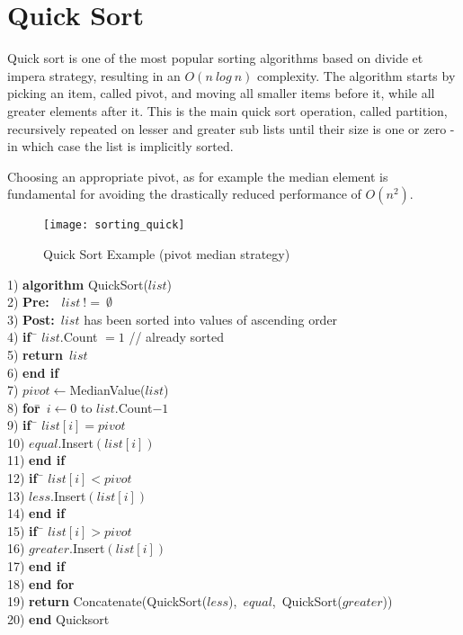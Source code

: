 \newpage
\section{Quick Sort} 
Quick sort is one of the most popular sorting algorithms based on divide et impera strategy, resulting in an $O(n~log~n)$ complexity. The algorithm starts by picking an item, called pivot, and moving all smaller items before it, while all greater elements after it. This is the main quick sort operation, called partition, recursively repeated on lesser and greater sub lists until their size  is one or zero - in which case the list is implicitly sorted.

Choosing an appropriate pivot, as for example the median element is fundamental for avoiding the drastically reduced performance of $O(n^{2})$.
\newpage

\begin{figure}[ht]
\begin{center}
\texttt{[image: sorting\_quick]}
\end{center}
\caption{Quick Sort Example (pivot median strategy)} \label{fig:sorting_quick}
\end{figure}


\begin{tabbing}
1)  \textbf{alg}\= \textbf{orithm} QuickSort($list$) \\
2)  \> \textbf{Pre:}~~$list~!=~\emptyset$ \\
3)  \> \textbf{Post:}~$list$ has been sorted into values of ascending order \\
4)  \> \textbf{if}~\= $list$.Count $= 1$ // already sorted \\
5)  \> \> \textbf{return}~$list$ \\
6)  \> \textbf{end if} \\
7)  \> $pivot \leftarrow $MedianValue($list$) \\
8)  \> \textbf{for}\=~$i \leftarrow 0$ to $list$.Count$-1$ \\
9)  \> \> \textbf{if}~\= $list[i] = pivot$ \\
10) \> \> \> $equal$.Insert$(list[i])$\\
11) \> \> \textbf{end if} \\
12) \> \> \textbf{if}~\= $list[i] < pivot$ \\
13) \> \> \> $less$.Insert$(list[i])$\\
14) \> \> \textbf{end if} \\
15) \> \> \textbf{if}~\= $list[i] > pivot$ \\
16) \> \> \> $greater$.Insert$(list[i])$\\
17) \> \> \textbf{end if} \\
18) \> \textbf{end for} \\
19) \> \textbf{return} Concatenate(QuickSort($less$),~$equal$,~QuickSort($greater$)) \\
20) \textbf{end} Quicksort \\
\end{tabbing}

